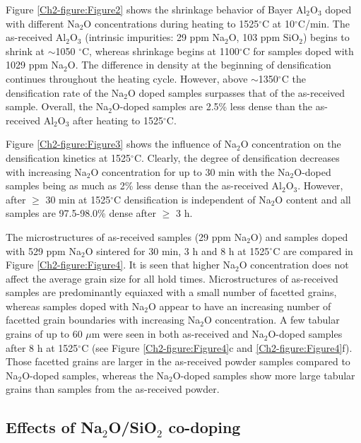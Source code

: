 Figure \ref{Ch2-figure:Figure2} shows the shrinkage behavior of Bayer Al$_{2}$O$_{3}$ doped with different Na$_{2}$O concentrations during heating to 1525$^{\circ}$C at 10$^{\circ}$C/min. The as-received Al$_{2}$O$_{3}$ (intrinsic impurities: 29 ppm Na$_{2}$O, 103 ppm SiO$_{2}$) begins to shrink at $\sim$1050 $^{\circ}$C, whereas shrinkage begins at 1100$^{\circ}$C for samples doped with 1029 ppm Na$_{2}$O. The difference in density at the beginning of densification continues throughout the heating cycle. However, above $\sim$1350$^{\circ}$C the densification rate of the Na$_{2}$O doped samples surpasses that of the as-received sample. Overall, the Na$_{2}$O-doped samples are 2.5\% less dense than the as-received Al$_{2}$O$_{3}$ after heating to 1525$^{\circ}$C.

Figure \ref{Ch2-figure:Figure3} shows the influence of Na$_{2}$O concentration on the densification kinetics at 1525$^{\circ}$C. Clearly, the degree of densification decreases with increasing Na$_{2}$O concentration for up to 30 min with the Na$_{2}$O-doped samples being as much as 2\% less dense than the as-received Al$_{2}$O$_{3}$. However, after $\geq$ 30 min at 1525$^{\circ}$C densification is independent of Na$_{2}$O content and all samples are 97.5-98.0\% dense after $\geq$ 3 h. 

The microstructures of as-received samples (29 ppm Na$_{2}$O) and samples doped with 529 ppm Na$_{2}$O sintered for 30 min, 3 h and 8 h at 1525$^{\circ}$C are compared in Figure \ref{Ch2-figure:Figure4}. It is seen that higher Na$_{2}$O concentration does not affect the average grain size for all hold times. Microstructures of as-received samples are predominantly equiaxed with a small number of facetted grains, whereas samples doped with Na$_{2}$O appear to have an increasing number of facetted grain boundaries with increasing Na$_{2}$O concentration. A few tabular grains of up to 60 $\mu$m were seen in both as-received and Na$_{2}$O-doped samples after 8 h at 1525$^{\circ}$C (see Figure \ref{Ch2-figure:Figure4}c and \ref{Ch2-figure:Figure4}f). Those facetted grains are larger in the as-received powder samples compared to Na$_{2}$O-doped samples, whereas the Na$_{2}$O-doped samples show more large tabular grains than samples from the as-received powder.

\subsection{Effects of Na$_{2}$O/SiO$_{2}$ co-doping}

